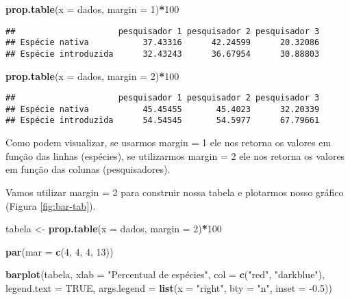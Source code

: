 \documentclass[]{book}
\newenvironment{Shaded}{\begin{snugshade}}{\end{snugshade}}
\newcommand{\DataTypeTok}[1]{\textcolor[rgb]{0.13,0.29,0.53}{#1}}
\newcommand{\DecValTok}[1]{\textcolor[rgb]{0.00,0.00,0.81}{#1}}
\newcommand{\FloatTok}[1]{\textcolor[rgb]{0.00,0.00,0.81}{#1}}
\newcommand{\KeywordTok}[1]{\textcolor[rgb]{0.13,0.29,0.53}{\textbf{#1}}}
\newcommand{\NormalTok}[1]{#1}
\newcommand{\OperatorTok}[1]{\textcolor[rgb]{0.81,0.36,0.00}{\textbf{#1}}}
\newcommand{\OtherTok}[1]{\textcolor[rgb]{0.56,0.35,0.01}{#1}}
\newcommand{\StringTok}[1]{\textcolor[rgb]{0.31,0.60,0.02}{#1}}
\begin{document}
\begin{Shaded}
\begin{Highlighting}[]
\KeywordTok{prop.table}\NormalTok{(}\DataTypeTok{x =}\NormalTok{ dados, }\DataTypeTok{margin =} \DecValTok{1}\NormalTok{)}\OperatorTok{*}\DecValTok{100}
\end{Highlighting}
\end{Shaded}

\begin{verbatim}
##                     pesquisador 1 pesquisador 2 pesquisador 3
## Espécie nativa           37.43316      42.24599      20.32086
## Espécie introduzida      32.43243      36.67954      30.88803
\end{verbatim}

\begin{Shaded}
\begin{Highlighting}[]
\KeywordTok{prop.table}\NormalTok{(}\DataTypeTok{x =}\NormalTok{ dados, }\DataTypeTok{margin =} \DecValTok{2}\NormalTok{)}\OperatorTok{*}\DecValTok{100}
\end{Highlighting}
\end{Shaded}

\begin{verbatim}
##                     pesquisador 1 pesquisador 2 pesquisador 3
## Espécie nativa           45.45455       45.4023      32.20339
## Espécie introduzida      54.54545       54.5977      67.79661
\end{verbatim}

Como podem visualizar, se usarmos margin = 1 ele nos retorna os valores em função das linhas (espécies), se utilizarmos margin = 2 ele nos retorna os valores em função das colunas (pesquisadores).

Vamos utilizar margin = 2 para construir nossa tabela e plotarmos nosso gráfico (Figura \ref{fig:bar-tab}).

\begin{Shaded}
\begin{Highlighting}[]
\NormalTok{tabela <-}\StringTok{ }\KeywordTok{prop.table}\NormalTok{(}\DataTypeTok{x =}\NormalTok{ dados, }\DataTypeTok{margin =} \DecValTok{2}\NormalTok{)}\OperatorTok{*}\DecValTok{100}

\KeywordTok{par}\NormalTok{(}\DataTypeTok{mar =} \KeywordTok{c}\NormalTok{(}\DecValTok{4}\NormalTok{, }\DecValTok{4}\NormalTok{, }\DecValTok{4}\NormalTok{, }\DecValTok{13}\NormalTok{))}

\KeywordTok{barplot}\NormalTok{(tabela, }
        \DataTypeTok{xlab =} \StringTok{"Percentual de espécies"}\NormalTok{,}
        \DataTypeTok{col =} \KeywordTok{c}\NormalTok{(}\StringTok{"red"}\NormalTok{, }\StringTok{"darkblue"}\NormalTok{), }
        \DataTypeTok{legend.text =} \OtherTok{TRUE}\NormalTok{, }
        \DataTypeTok{args.legend =} \KeywordTok{list}\NormalTok{(}\DataTypeTok{x =} \StringTok{"right"}\NormalTok{, }\DataTypeTok{bty =} \StringTok{"n"}\NormalTok{, }\DataTypeTok{inset =} \FloatTok{-0.5}\NormalTok{))}
\end{Highlighting}
\end{Shaded}
\end{document}
